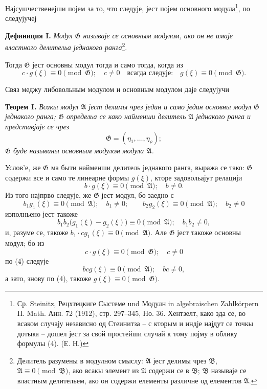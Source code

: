 \documentclass[11pt]{article}
\providecommand{\Amod}{\mathfrak A}
\providecommand{\Bmod}{\mathfrak B}
\providecommand{\Gmod}{\mathfrak G}
\providecommand{\zero}[1]{\equiv 0\pmod{#1}}
\begin{document}
Најсушчественејши појем за то, что следује, јест појем основного модула\footnote{Ср. Steinitz, Рецхтецкиге Сыстеме und Модулн in algebraischen Zahlkörpern II. Math. Анн. 72 (1912), стр. 297--345, Но. 36. Хентзелт, како зда се, во всаком случају независно од Стеинитза -- с кторым и индје најдут се точкы дотыка -- дошел јест за свой простейши случай к тому појму в облику формулы (4). (Е. Н.)}, по следујучеј

\medskip
\noindent\textbf{Дефиниция I.} \emph{Модул $\Gmod$ называје се основным модулом, ако он не имаје властного делительа једнакого ранга}\footnote{Делитель разумены в модулном смыслу: $\Amod$ јест делимы чрез $\Bmod$, $\Amod\zero{\Bmod}$, ако всакы элемент из $\Amod$ содержи се в $\Bmod$; $\Bmod$ называје се властным делительем, ако он содержи елементы различне од елементов $\Amod$.}.

Тогда $\Gmod$ јест основны модул тогда и само тогда, когда из
\begin{equation}
 c\cdot g(\xi)\zero{\Gmod};\quad c\ne0 \quad\text{всагда следује:}\quad g(\xi)\zero{\Gmod}.
\tag{2}
\end{equation}

Связ меджу либовольным модулом и основным модулом даје следујучи

\medskip
\noindent\textbf{Теорем I.} \emph{Всакы модул $\Amod$ јест делимы чрез једин и само једин основны модул $\Gmod$ једнакого ранга; $\Gmod$ определьа се како найменши делитель $\Amod$ једнакого ранга и представјаје се чрез}
\begin{equation}
 \Gmod=(\eta_1,\ldots,\eta_\rho);
\tag{3}
\end{equation}
\emph{$\Gmod$ буде называны основным модулом модула $\Amod$.}

Услов’е, же $\Gmod$ ма быти найменши делитель једнакого ранга, выража се тако: $\Gmod$ содержи все и само те линеарне формы $g(\xi)$, кторе задовольајут релацији
\begin{equation}
 b\cdot g(\xi)\zero{\Amod};\quad b\ne0.
\tag{4}
\end{equation}
Из того најпрво следује, же $\Gmod$ јест модул, бо заедно с
\[
 b_1g_1(\xi)\zero{\Amod};\quad b_1\ne0;
 \qquad
 b_2g_2(\xi)\zero{\Amod};\quad b_2\ne0
\]
изполньено јест такоже
\[
 b_1b_2\bigl(g_1(\xi)-g_2(\xi)\bigr)\zero{\Amod};\quad b_1b_2\ne0,
\]
и, разуме се, такоже $b_1\cdot c g_1(\xi)\zero{\Amod}$. Але $\Gmod$ јест такоже основны модул; бо из
\[
 c\cdot g(\xi)\zero{\Gmod};\quad c\ne0
\]
по (4) следује
\[
 b c g(\xi)\zero{\Amod};\quad bc\ne0,
\]
а зато, знову по (4), такоже $g(\xi)\zero{\Gmod}$.
\end{document}
